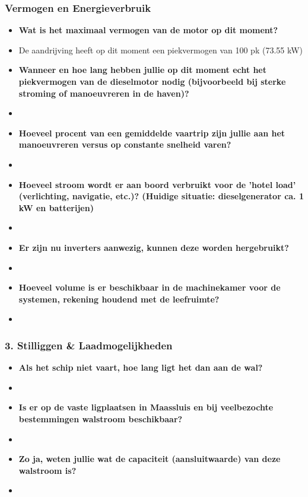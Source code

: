 \subsubsection{Vermogen en Energieverbruik}
\begin{itemize}
    \item \textbf{Wat is het maximaal vermogen van de motor op dit moment?} 
    \item De aandrijving heeft op  dit moment een piekvermogen van 100 pk (73.55 kW)
    \item \textbf{Wanneer en hoe lang hebben jullie op dit moment echt het piekvermogen van de dieselmotor nodig (bijvoorbeeld bij sterke stroming of manoeuvreren in de haven)?}
    \item \ 
    \item \textbf{Hoeveel procent van een gemiddelde vaartrip zijn jullie aan het manoeuvreren versus op constante snelheid varen?}
    \item \ 
    \item \textbf{Hoeveel stroom wordt er aan boord verbruikt voor de 'hotel load' (verlichting, navigatie, etc.)? (Huidige situatie: dieselgenerator ca. 1 kW en batterijen)}
    \item  
    \item \textbf{Er zijn nu inverters aanwezig, kunnen deze worden hergebruikt?}
    \item 
    \item \textbf{Hoeveel volume is er beschikbaar in de machinekamer voor de systemen, rekening houdend met de leefruimte?}
    \item 
\end{itemize}

\subsubsection{3. Stilliggen \& Laadmogelijkheden}
\begin{itemize}
    \item \textbf{Als het schip niet vaart, hoe lang ligt het dan aan de wal?}
    \item
    \item \textbf{Is er op de vaste ligplaatsen in Maassluis en bij veelbezochte bestemmingen walstroom beschikbaar?}
    \item  
    \item \textbf{Zo ja, weten jullie wat de capaciteit (aansluitwaarde) van deze walstroom is?}
    \item 
\end{itemize}

